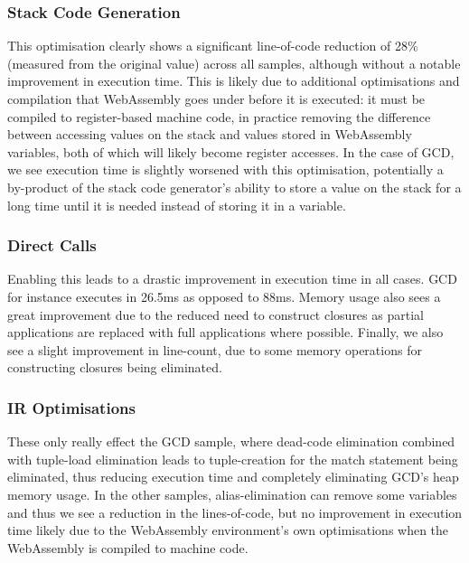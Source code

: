 \subsubsection{Stack Code Generation}
This optimisation clearly shows a significant line-of-code reduction of 28\% (measured from the original value) across all samples, although without a notable improvement in execution time. This is likely due to additional optimisations and compilation that WebAssembly goes under before it is executed: it must be compiled to register-based machine code, in practice removing the difference between accessing values on the stack and values stored in WebAssembly variables, both of which will likely become register accesses. In the case of GCD, we see execution time is slightly worsened with this optimisation, potentially a by-product of the stack code generator's ability to store a value on the stack for a long time until it is needed instead of storing it in a variable.

\subsubsection{Direct Calls}
Enabling this leads to a drastic improvement in execution time in all cases. GCD for instance executes in 26.5ms as opposed to 88ms. Memory usage also sees a great improvement due to the reduced need to construct closures as partial applications are replaced with full applications where possible. Finally, we also see a slight improvement in line-count, due to some memory operations for constructing closures being eliminated.

\subsubsection{IR Optimisations}
These only really effect the GCD sample, where dead-code elimination combined with tuple-load elimination leads to tuple-creation for the match statement being eliminated, thus reducing execution time and completely eliminating GCD's heap memory usage. In the other samples, alias-elimination can remove some variables and thus we see a reduction in the lines-of-code, but no improvement in execution time likely due to the WebAssembly environment's own optimisations when the WebAssembly is compiled to machine code.

